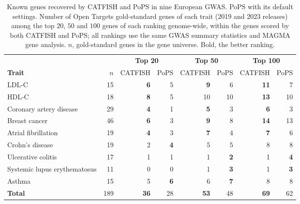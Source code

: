 \begin{table}[!t]
\centering
\caption{Known genes recovered by CATFISH and PoPS in nine European GWAS. PoPS with its default settings. Number of Open Targets gold-standard genes of each trait (2019 and 2023 releases) among the top $20$, $50$ and $100$ genes of each ranking genome-wide, within the genes scored by both CATFISH and PoPS; all rankings use the same GWAS summary statistics and MAGMA gene analysis. $n$, gold-standard genes in the gene universe. Bold, the better ranking.}
\label{tab:benchmark_topk_all}
\small
\setlength{\tabcolsep}{4pt}
\begin{tabular*}{\linewidth}{@{\extracolsep{\fill}}lrrrrrrr}
\hline
 & & \multicolumn{2}{c}{\textbf{Top 20}} & \multicolumn{2}{c}{\textbf{Top 50}} & \multicolumn{2}{c}{\textbf{Top 100}} \\
\textbf{Trait} & $n$ & CATFISH & PoPS & CATFISH & PoPS & CATFISH & PoPS \\
\hline
LDL-C & 15 & \textbf{6} & 5 & \textbf{9} & 6 & \textbf{11} & 7 \\
HDL-C & 18 & \textbf{8} & 5 & 10 & 10 & \textbf{13} & 10 \\
Coronary artery disease & 29 & \textbf{4} & 1 & \textbf{5} & 3 & \textbf{6} & 3 \\
Breast cancer & 46 & \textbf{6} & 3 & \textbf{9} & 8 & \textbf{14} & 13 \\
Atrial fibrillation & 19 & \textbf{4} & 3 & \textbf{7} & 4 & \textbf{7} & 6 \\
Crohn's disease & 19 & 2 & \textbf{4} & 5 & 5 & 8 & 8 \\
Ulcerative colitis & 17 & 1 & 1 & 1 & \textbf{2} & 1 & \textbf{4} \\
Systemic lupus erythematosus & 11 & 0 & 0 & 1 & \textbf{3} & 1 & \textbf{3} \\
Asthma & 15 & 5 & \textbf{6} & 6 & \textbf{7} & 8 & 8 \\
\hline
\textbf{Total} & 189 & \textbf{36} & 28 & \textbf{53} & 48 & \textbf{69} & 62 \\
\hline
\end{tabular*}
\end{table}
